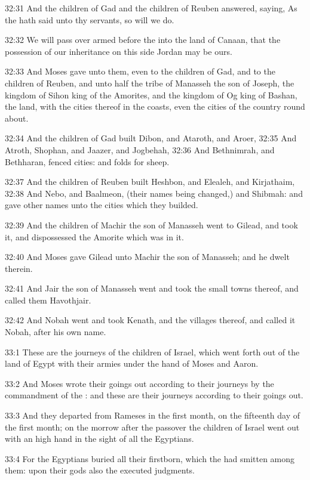 32:31 And the children of Gad and the children of Reuben answered,
saying, As the \LORD hath said unto thy servants, so will we do.

32:32 We will pass over armed before the \LORD into the land of Canaan,
that the possession of our inheritance on this side Jordan may be
ours.

32:33 And Moses gave unto them, even to the children of Gad, and to
the children of Reuben, and unto half the tribe of Manasseh the son of
Joseph, the kingdom of Sihon king of the Amorites, and the kingdom of
Og king of Bashan, the land, with the cities thereof in the coasts,
even the cities of the country round about.

32:34 And the children of Gad built Dibon, and Ataroth, and Aroer,
32:35 And Atroth, Shophan, and Jaazer, and Jogbehah, 32:36 And
Bethnimrah, and Bethharan, fenced cities: and folds for sheep.

32:37 And the children of Reuben built Heshbon, and Elealeh, and
Kirjathaim, 32:38 And Nebo, and Baalmeon, (their names being changed,)
and Shibmah: and gave other names unto the cities which they builded.

32:39 And the children of Machir the son of Manasseh went to Gilead,
and took it, and dispossessed the Amorite which was in it.

32:40 And Moses gave Gilead unto Machir the son of Manasseh; and he
dwelt therein.

32:41 And Jair the son of Manasseh went and took the small towns
thereof, and called them Havothjair.

32:42 And Nobah went and took Kenath, and the villages thereof, and
called it Nobah, after his own name.

33:1 These are the journeys of the children of Israel, which went
forth out of the land of Egypt with their armies under the hand of
Moses and Aaron.

33:2 And Moses wrote their goings out according to their journeys by
the commandment of the \LORD: and these are their journeys according to
their goings out.

33:3 And they departed from Rameses in the first month, on the
fifteenth day of the first month; on the morrow after the passover the
children of Israel went out with an high hand in the sight of all the
Egyptians.

33:4 For the Egyptians buried all their firstborn, which the \LORD had
smitten among them: upon their gods also the \LORD executed judgments.

